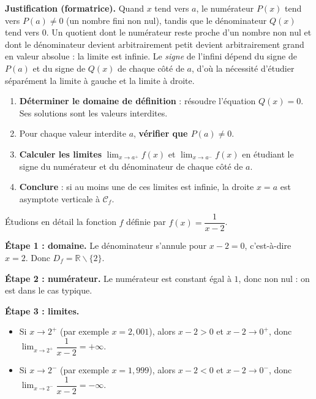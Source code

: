 \documentclass[11pt]{article}
\newcounter{popsec}
\newcounter{popsub}
\newcommand{\courssub}[1]{%
  \stepcounter{popsub}%
  \par\vspace{9pt}\noindent{\popxbold\fontsize{11.5}{13}\selectfont\color{popink}{\color{poporange}\thepopsec.\thepopsub}\hspace{6pt}#1}\par\nopagebreak\vspace{4pt}
}
\def\setminus{\mathbin{\backslash}}\let\smallsetminus\setminus
\begin{document}
\textbf{Justification (formatrice).} Quand $x$ tend vers $a$, le numérateur $P(x)$ tend vers $P(a)\neq 0$ (un nombre fini non nul), tandis que le dénominateur $Q(x)$ tend vers $0$. Un quotient dont le numérateur reste proche d'un nombre non nul et dont le dénominateur devient arbitrairement petit devient arbitrairement grand en valeur absolue : la limite est infinie. Le \emph{signe} de l'infini dépend du signe de $P(a)$ et du signe de $Q(x)$ de chaque côté de $a$, d'où la nécessité d'étudier séparément la limite à gauche et la limite à droite.

\begin{methode}[Repérer les asymptotes verticales d'une fonction rationnelle $f=\dfrac{P}{Q}$]
\begin{enumerate}
\item \textbf{Déterminer le domaine de définition} : résoudre l'équation $Q(x)=0$. Ses solutions sont les valeurs interdites.
\item Pour chaque valeur interdite $a$, \textbf{vérifier que $P(a)\neq 0$}.
\item \textbf{Calculer les limites} $\lim_{x\to a^{+}} f(x)$ et $\lim_{x\to a^{-}} f(x)$ en étudiant le signe du numérateur et du dénominateur de chaque côté de $a$.
\item \textbf{Conclure} : si au moins une de ces limites est infinie, la droite $x=a$ est asymptote verticale à $\mathcal{C}_f$.
\end{enumerate}
\end{methode}

\courssub{Exemple fondateur : $f(x)=\dfrac{1}{x-2}$}

Étudions en détail la fonction $f$ définie par $f(x)=\dfrac{1}{x-2}$.

\textbf{Étape 1 : domaine.} Le dénominateur s'annule pour $x-2=0$, c'est-à-dire $x=2$. Donc $D_f=\mathbb{R}\setminus\{2\}$.

\textbf{Étape 2 : numérateur.} Le numérateur est constant égal à $1$, donc non nul : on est dans le cas typique.

\textbf{Étape 3 : limites.}
\begin{itemize}
\item Si $x\to 2^{+}$ (par exemple $x=2{,}001$), alors $x-2>0$ et $x-2\to 0^{+}$, donc $\displaystyle\lim_{x\to 2^{+}}\dfrac{1}{x-2}=+\infty$.
\item Si $x\to 2^{-}$ (par exemple $x=1{,}999$), alors $x-2<0$ et $x-2\to 0^{-}$, donc $\displaystyle\lim_{x\to 2^{-}}\dfrac{1}{x-2}=-\infty$.
\end{itemize}
\end{document}

